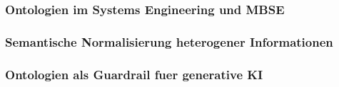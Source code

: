 \subsubsection{Ontologien im Systems Engineering und MBSE}
\label{sec:ontology_mbse}

%
%
%
%
%
%
%
%
%


\subsubsection{Semantische Normalisierung heterogener Informationen}
\label{sec:semantic_normalization}

%
%
%
%
%
%
%
%


\subsubsection{Ontologien als Guardrail fuer generative KI}
\label{sec:ontology_guardrail}

